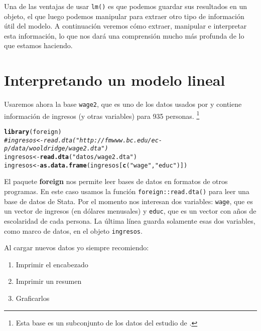 \documentclass{report}\usepackage[]{graphicx}\usepackage[]{color}
\makeatletter
\newcommand{\hlstr}[1]{\textcolor[rgb]{0.192,0.494,0.8}{#1}}%
\newcommand{\hlcom}[1]{\textcolor[rgb]{0.678,0.584,0.686}{\textit{#1}}}%
\newcommand{\hlstd}[1]{\textcolor[rgb]{0.345,0.345,0.345}{#1}}%
\newcommand{\hlkwb}[1]{\textcolor[rgb]{0.69,0.353,0.396}{#1}}%
\newcommand{\hlkwd}[1]{\textcolor[rgb]{0.737,0.353,0.396}{\textbf{#1}}}%
\newenvironment{kframe}{%
 \def\at@end@of@kframe{}%
 \ifinner\ifhmode%
  \def\at@end@of@kframe{\end{minipage}}%
  \begin{minipage}{\columnwidth}%
 \fi\fi%
 \def\FrameCommand##1{\hskip\@totalleftmargin \hskip-\fboxsep
 \colorbox{shadecolor}{##1}\hskip-\fboxsep
     \hskip-\linewidth \hskip-\@totalleftmargin \hskip\columnwidth}%
 \MakeFramed {\advance\hsize-\width
   \@totalleftmargin\z@ \linewidth\hsize
   \@setminipage}}%
 {\par\unskip\endMakeFramed%
 \at@end@of@kframe}
\newenvironment{knitrout}{}{} %
\newcommand*{\paq}[1]{\textbf{#1}\index{#1@\textbf{#1}}}
\makeatother
\begin{document}
Una de las ventajas de usar \verb|lm()| es que podemos guardar sus resultados en un objeto, el que luego podemos manipular para extraer otro tipo de información útil del modelo. A continuación veremos cómo extraer, manipular e interpretar esta información, lo que nos dará una comprensión mucho más profunda de lo que estamos haciendo.


\section{Interpretando un modelo lineal}

Usaremos ahora la base \verb|wage2|, que es uno de los datos usados por \textcite{wooldridge_introductory_2016} y contiene información de ingresos (y otras variables) para 935 personas. \footnote{Esta base es un subconjunto de los datos del estudio de \textcite{blackburn_unobserved_1992}.}

\begin{knitrout}
\color{fgcolor}\begin{kframe}
\begin{alltt}
\hlkwd{library}\hlstd{(foreign)}
\hlcom{#ingresos <- read.dta("http://fmwww.bc.edu/ec-p/data/wooldridge/wage2.dta")}
\hlstd{ingresos} \hlkwb{<-} \hlkwd{read.dta}\hlstd{(}\hlstr{"datos/wage2.dta"}\hlstd{)}
\hlstd{ingresos} \hlkwb{<-} \hlkwd{as.data.frame}\hlstd{(ingresos[}\hlkwd{c}\hlstd{(}\hlstr{"wage"}\hlstd{,}\hlstr{"educ"}\hlstd{)])}
\end{alltt}
\end{kframe}
\end{knitrout}

El paquete \paq{foreign} nos permite leer bases de datos en formatos de otros programas. En este caso usamos la función \verb|foreign::read.dta()| para leer una base de datos de Stata.
Por el momento nos interesan dos variables: \verb|wage|, que es un vector de ingresos (en dólares menusales) y \verb|educ|, que es un vector con años de escolaridad de cada persona. La última línea guarda solamente esas dos variables, como marco de datos, en el objeto \verb|ingresos|.

Al cargar nuevos datos yo siempre recomiendo:
\begin{enumerate}
\item Imprimir el encabezado
\item Imprimir un resumen
\item Graficarlos
\end{enumerate}
\end{document}
